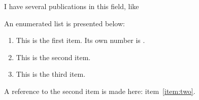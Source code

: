 \documentclass{article}
\begin{document}
I have several publications in this field, like \cite{wang2022}


An enumerated list is presented below:
\begin{enumerate}
    \item This is the first item. Its own number is \theenumi.
    \item This is the second item. \label{item:two}
    \item This is the third item.
\end{enumerate}

A reference to the second item is made here: item~\ref{item:two}.

% 
% 
\printbibliography
\end{document}
